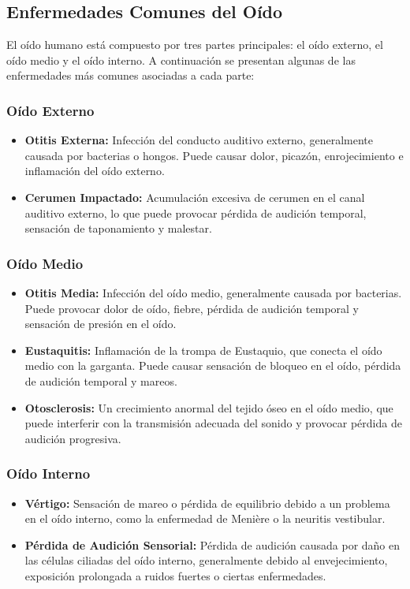 \documentclass[
	12pt, %
	fleqn, %
	a4paper, %
	oneside, %
]{LegrandOrangeBook}
\begin{document}
\subsection{Enfermedades Comunes del Oído}
El oído humano está compuesto por tres partes principales: el oído externo, el oído medio y el oído interno. A continuación se presentan algunas de las enfermedades más comunes asociadas a cada parte:
\subsubsection{Oído Externo}
\begin{itemize}
  \item \textbf{Otitis Externa:} Infección del conducto auditivo externo, generalmente causada por bacterias o hongos. Puede causar dolor, picazón, enrojecimiento e inflamación del oído externo.
  \item \textbf{Cerumen Impactado:} Acumulación excesiva de cerumen en el canal auditivo externo, lo que puede provocar pérdida de audición temporal, sensación de taponamiento y malestar.
\end{itemize}
\subsubsection{Oído Medio}
\begin{itemize}
  \item \textbf{Otitis Media:} Infección del oído medio, generalmente causada por bacterias. Puede provocar dolor de oído, fiebre, pérdida de audición temporal y sensación de presión en el oído.
  \item \textbf{Eustaquitis:} Inflamación de la trompa de Eustaquio, que conecta el oído medio con la garganta. Puede causar sensación de bloqueo en el oído, pérdida de audición temporal y mareos.
  \item \textbf{Otosclerosis:} Un crecimiento anormal del tejido óseo en el oído medio, que puede interferir con la transmisión adecuada del sonido y provocar pérdida de audición progresiva.
\end{itemize}
\subsubsection{Oído Interno}
\begin{itemize}
  \item \textbf{Vértigo:} Sensación de mareo o pérdida de equilibrio debido a un problema en el oído interno, como la enfermedad de Menière o la neuritis vestibular.
  \item \textbf{Pérdida de Audición Sensorial:} Pérdida de audición causada por daño en las células ciliadas del oído interno, generalmente debido al envejecimiento, exposición prolongada a ruidos fuertes o ciertas enfermedades.
\end{itemize}
\end{document}
